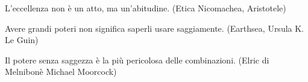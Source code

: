 \bigskip

\begin{enfasi}

	L'eccellenza non è un atto, ma un'abitudine. (Etica Nicomachea, Aristotele)

	\medskip

	Avere grandi poteri non significa saperli usare saggiamente. (Earthsea, Ursula K. Le Guin)

	\medskip

	Il potere senza saggezza è la più pericolosa delle combinazioni. (Elric di Melnibonè Michael Moorcock)

\end{enfasi}

\pagebreak


